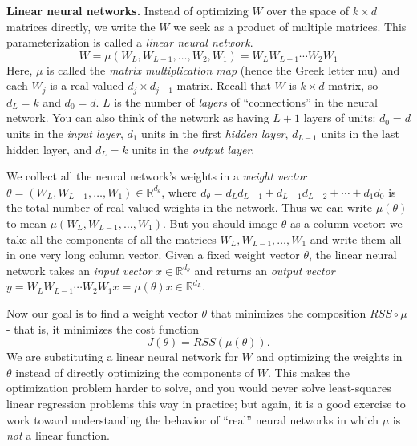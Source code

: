 \documentclass{article}
\begin{document}
\textbf{Linear neural networks.} Instead of optimizing $W$ over the space of $k \times d$ matrices directly, we write the $W$ we seek as a product of multiple matrices. This parameterization is called a \textit{linear neural network}.
    \begin{equation*}
        W = \mu(W_{L}, W_{L - 1}, \ldots, W_{2}, W_{1}) = W_{L}W_{L - 1} \cdots W_{2}W_{1}
    \end{equation*}
Here, $\mu$ is called the \textit{matrix multiplication map} (hence the Greek letter mu) and each $W_{j}$ is a real-valued $d_{j} \times d_{j - 1}$ matrix. Recall that $W$ is $k \times d$ matrix, so $d_{L} = k$ and $d_{0} = d$. $L$ is the number of \textit{layers} of ``connections'' in the neural network. You can also think of the network as having $L + 1$ layers of units: $d_{0} = d$ units in the \textit{input layer}, $d_{1}$ units in the first \textit{hidden layer}, $d_{L - 1}$ units in the last hidden layer, and $d_{L} = k$ units in the \textit{output layer}.

We collect all the neural network's weights in a \textit{weight vector} $\theta = (W_{L}, W_{L - 1}, \ldots, W_{1}) \in \mathbb{R}^{d_{\theta}}$, where $d_{\theta} = d_{L}d_{L - 1} + d_{L - 1}d_{L - 2} + \cdots + d_{1}d_{0}$ is the total number of real-valued weights in the network. Thus we can write $\mu(\theta)$ to mean $\mu(W_{L}, W_{L - 1}, \ldots, W_{1})$. But you should image $\theta$ as a column vector: we take all the components of all the matrices $W_{L}, W_{L - 1}, \ldots, W_{1}$ and write them all in one very long column vector. Given a fixed weight vector $\theta$, the linear neural network takes an \textit{input vector} $x \in \mathbb{R}^{d_{\theta}}$ and returns an \textit{output vector} $y = W_{L}W_{L - 1}\cdots W_{2}W_{1}x = \mu(\theta)x \in \mathbb{R}^{d_{L}}$.

Now our goal is to find a weight vector $\theta$ that minimizes the composition $RSS \circ \mu$ - that is, it minimizes the cost function
    \begin{equation*}
        J(\theta) = RSS(\mu(\theta)).
    \end{equation*}
We are substituting a linear neural network for $W$ and optimizing the weights in $\theta$ instead of directly optimizing the components of $W$. This makes the optimization problem harder to solve, and you would never solve least-squares linear regression problems this way in practice; but again, it is a good exercise to work toward understanding the behavior of ``real'' neural networks in which $\mu$ is \textit{not} a linear function.
\end{document}
